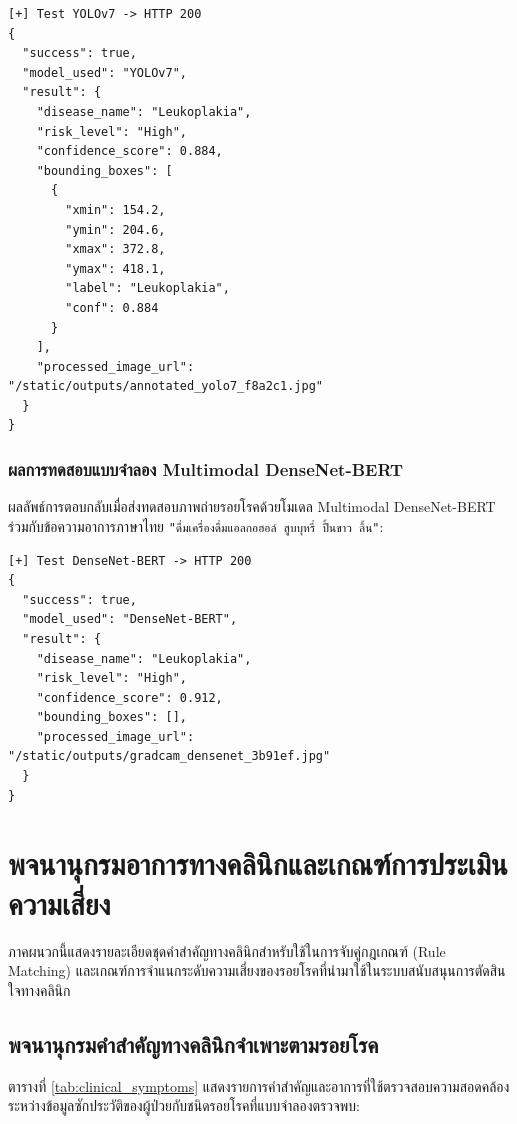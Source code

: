 \begin{verbatim}
[+] Test YOLOv7 -> HTTP 200
{
  "success": true,
  "model_used": "YOLOv7",
  "result": {
    "disease_name": "Leukoplakia",
    "risk_level": "High",
    "confidence_score": 0.884,
    "bounding_boxes": [
      {
        "xmin": 154.2,
        "ymin": 204.6,
        "xmax": 372.8,
        "ymax": 418.1,
        "label": "Leukoplakia",
        "conf": 0.884
      }
    ],
    "processed_image_url": "/static/outputs/annotated_yolo7_f8a2c1.jpg"
  }
}
\end{verbatim}

\subsection{ผลการทดสอบแบบจำลอง Multimodal DenseNet-BERT}
ผลลัพธ์การตอบกลับเมื่อส่งทดสอบภาพถ่ายรอยโรคด้วยโมเดล Multimodal DenseNet-BERT ร่วมกับข้อความอาการภาษาไทย \texttt{"ดื่มเครื่องดื่มแอลกอฮอล์ สูบบุหรี่ ปื้นขาว ลิ้น"}:

\begin{verbatim}
[+] Test DenseNet-BERT -> HTTP 200
{
  "success": true,
  "model_used": "DenseNet-BERT",
  "result": {
    "disease_name": "Leukoplakia",
    "risk_level": "High",
    "confidence_score": 0.912,
    "bounding_boxes": [],
    "processed_image_url": "/static/outputs/gradcam_densenet_3b91ef.jpg"
  }
}
\end{verbatim}

\chapter{พจนานุกรมอาการทางคลินิกและเกณฑ์การประเมินความเสี่ยง}
\label{appendix:clinical_dictionary}

ภาคผนวกนี้แสดงรายละเอียดชุดคำสำคัญทางคลินิกสำหรับใช้ในการจับคู่กฎเกณฑ์ (Rule Matching) และเกณฑ์การจำแนกระดับความเสี่ยงของรอยโรคที่นำมาใช้ในระบบสนับสนุนการตัดสินใจทางคลินิก

\section{พจนานุกรมคำสำคัญทางคลินิกจำเพาะตามรอยโรค}
ตารางที่ \ref{tab:clinical_symptoms} แสดงรายการคำสำคัญและอาการที่ใช้ตรวจสอบความสอดคล้องระหว่างข้อมูลซักประวัติของผู้ป่วยกับชนิดรอยโรคที่แบบจำลองตรวจพบ:

